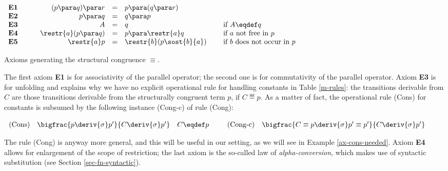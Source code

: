 \begin{table}[t]
{\renewcommand{\arraystretch}{1.8}
\normalsize{

\begin{center}

\hrulefill

$\begin{array}{llrclllrrl}
{\bf E1} &\; \; &\; \;  (p \para q) \para r & = & p \para (q \para r) \\
{\bf E2} &\; \; &\; \; p \para q & = & q \para p \\
{\bf E3} &\; \; &\; \; A & = & q & \quad \mbox{ if $A \eqdef q$}\\
{\bf E4} &\; \; &\; \; \restr{a} (p \para q)  & = & p \para \restr{a}q &  \quad \mbox{ if $a$ not free in $p$}\\
{\bf E5} &\; \; &\; \; \restr{a} p & = &  \restr{b} (p\sost{b}{a}) & \quad \mbox{ if $b$ does not occur in $p$}\\
\end{array}$


\hrulefill

\end{center}}
}
\caption{Axioms generating the structural congruence $\equiv$.}\label{structural}
\end{table}


The first axiom {\bf E1} is for associativity of the parallel operator; the second one is for commutativity
of the parallel operator. Axiom {\bf E3} is for unfolding and explains 
why we have no explicit operational rule for handling constants in Table \ref{m-rules}: the transitions derivable from $C$
are those transitions derivable from the structurally congruent term $p$, if $C \eqdef p$. As a matter
of fact, the operational rule (Cons) for constants is subsumed by the following instance (Cong-c) of rule (Cong):

$\begin{array}{lcllcl}
\mbox{(Cons)} & \bigfrac{p \deriv{\sigma}p'}{C\deriv{\sigma}p'}  & C\eqdef p & & \; \; 
\mbox{(Cong-c)}  & \bigfrac{C \equiv p\deriv{\sigma}p' \equiv p'}{C\deriv{\sigma}p'} \\
\end{array}$

The rule (Cong) is anyway more general, and this will be useful in our setting, as we will see in 
Example \ref{ax-cons-needed}.
Axiom {\bf E4} allows for enlargement of the scope of restriction;
the last axiom is the so-called law of {\em alpha-conversion}, which makes use of syntactic 
substitution (see Section \ref{sec-fn-syntactic}). 

